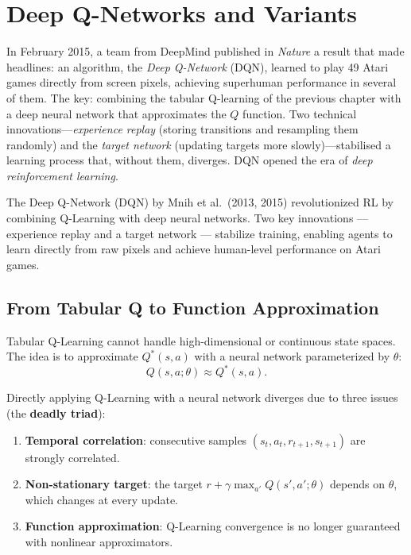 \chapter{Deep Q-Networks and Variants}
\label{ch:dqn}

In February 2015, a team from DeepMind published in \emph{Nature} a result that made headlines: an algorithm, the \emph{Deep Q-Network} (DQN), learned to play 49 Atari games directly from screen pixels, achieving superhuman performance in several of them. The key: combining the tabular Q-learning of the previous chapter with a deep neural network that approximates the $Q$ function. Two technical innovations---\emph{experience replay} (storing transitions and resampling them randomly) and the \emph{target network} (updating targets more slowly)---stabilised a learning process that, without them, diverges. DQN opened the era of \emph{deep reinforcement learning}.

\begin{intuition}
The Deep Q-Network (DQN) by Mnih et al.\ (2013, 2015) revolutionized RL
by combining Q-Learning with deep neural networks. Two key innovations
--- experience replay and a target network --- stabilize training,
enabling agents to learn directly from raw pixels and achieve human-level
performance on Atari games.
\end{intuition}

\section{From Tabular Q to Function Approximation}
\label{sec:dqn:approx}

Tabular Q-Learning cannot handle high-dimensional or continuous state
spaces. The idea is to approximate $Q^*(s,a)$ with a neural network
parameterized by $\theta$:
\[
    Q(s, a; \theta) \approx Q^*(s, a).
\]

\begin{attention}[title=\textbf{Naive Instability}]
Directly applying Q-Learning with a neural network diverges due to three
issues (the \textbf{deadly triad}):
\begin{enumerate}
    \item \textbf{Temporal correlation}: consecutive samples
    $(s_t, a_t, r_{t+1}, s_{t+1})$ are strongly correlated.
    \item \textbf{Non-stationary target}: the target
    $r + \gamma \max_{a'} Q(s', a'; \theta)$ depends on $\theta$,
    which changes at every update.
    \item \textbf{Function approximation}: Q-Learning convergence
    is no longer guaranteed with nonlinear approximators.
\end{enumerate}
\end{attention}

